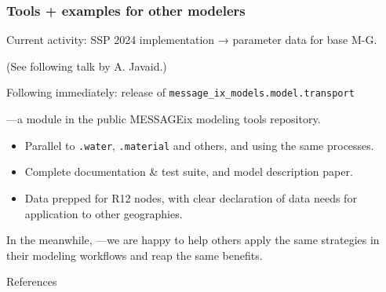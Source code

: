 \documentclass[12pt,aspectratio=169]{beamer}
\begin{document}
\begin{frame}
\frametitle{Tools + examples for other modelers}

Current activity: SSP 2024 implementation → parameter data for base M-G.

(See following talk by A. Javaid.)

\bigskip
Following immediately: release of \texttt{message\_ix\_models.model.transport}

—a module in the public MESSAGEix modeling tools repository.
\begin{itemize}
  \item Parallel to \texttt{.water}, \texttt{.material} and others, and using the same processes.
  \item Complete documentation \& test suite, and model description paper.
  \item Data prepped for R12 nodes, with clear declaration of data needs for application to other geographies.
\end{itemize}

\bigskip
In the meanwhile, —we are happy to help others apply the same strategies in their modeling workflows and reap the same benefits.
\end{frame}

\begin{frame}[plain]
  \centering \Huge {}
\end{frame}

\appendix

\begin{frame}{References}
  \printbibliography[heading=none]
\end{frame}


% 

% 


\end{document}

